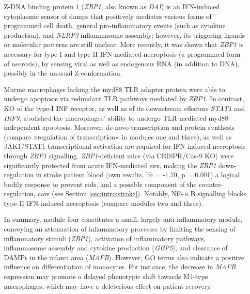 Z-DNA binding protein 1 (\emph{ZBP1}, also known as \emph{DAI}) is an IFN-induced cytoplasmic sensor of \acp{damp} that positively mediates various forms of programmed cell death, general pro-inflammatory events (such as cytokine production), and \emph{NLRP3} inflammasome assembly; however, its triggering ligands or molecular patterns are still unclear.\cite{Kuriakose2018} More recently, it was shown that \emph{ZBP1} is necessary for type-I and type-II IFN-mediated necroptosis (a programmed form of necrosis),\cite{Yang2019} by sensing viral as well as endogenous RNA (in addition to DNA), possibly in the unusual Z-conformation.\cite{Maelfait2017} 

Murine macrophages lacking the \ac{myd88} TLR adapter protein were able to undergo apoptosis via redundant TLR pathways mediated by \emph{ZBP1}. In contrast, KO of the type-I INF receptor, as well as of its downstream effectors \emph{STAT1} and \emph{IRF9}, abolished the macrophages' ability to undergo TLR-mediated \ac{myd88}-independent apoptosis.\cite{Kuriakose2016} Moreover, de-novo transcription and protein synthesis (compare »regulation of transcription« in modules one and three), as well as JAK1/STAT1 transcriptional activation are required for IFN-induced necroptosis through \emph{ZBP1} signalling.\cite{Yang2019} \emph{ZBP1}-deficient mice (via CRISPR/Cas-9 KO) were significantly protected from acute IFN-mediated \acf{sirs},\cite{Yang2019} making the \emph{ZBP1} down-regulation in stroke patient blood (own results, \ac{lfc} = -1.70, p = 0.001) a logical bodily response to prevent \acf{cids}, and a possible component of the counter-regulation, \acf{cars} (see Section \ref{sec:intro:stroke}). Notably, NF-$\upkappa$B signalling blocks type-II IFN-induced necroptosis (compare modules two and three).\cite{Thapa2011}


In summary, module four constitutes a small, largely anti-inflammatory module, conveying an attenuation of inflammatory processes by limiting the sensing of inflammatory stimuli (\emph{ZBP1}), activation of inflammatory pathways, inflammasome assembly and cytokine production (\emph{GBP5}), and clearance of DAMPs in the infarct area (\emph{MAFB}). However, GO terms also indicate a positive influence on differentiation of monocytes. For instance, the decrease in \emph{MAFB} expression may promote a delayed phenotypic shift towards M1-type macrophages, which may have a deleterious effect on patient recovery.

